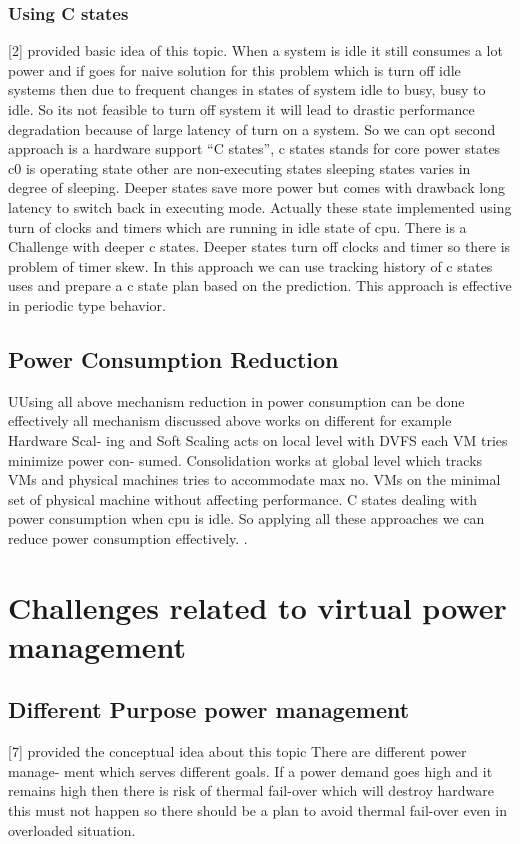 \documentclass[seminar,twoside]{iitbreport}
\begin{document}
\subsubsection{Using C states}
[2] provided basic idea of this topic. When a system is idle it still consumes a lot power
and if goes for naive solution for this problem which is turn off idle systems then due to
frequent changes in states of system idle to busy, busy to idle. So its not feasible to turn off
system it will lead to drastic performance degradation because of large latency of turn on
a system. So we can opt second approach is a hardware support “C states”, c states stands
for core power states c0 is operating state other are non-executing states sleeping states
varies in degree of sleeping. Deeper states save more power but comes with drawback
long latency to switch back in executing mode. Actually these state implemented using
turn of clocks and timers which are running in idle state of cpu. There is a Challenge with
deeper c states. Deeper states turn off clocks and timer so there is problem of timer skew.
In this approach we can use tracking history of c states uses and prepare a c state plan
based on the prediction. This approach is effective in periodic type behavior.
\subsection{Power Consumption Reduction}
UUsing all above mechanism reduction in power consumption can be done effectively
all mechanism discussed above works on different for example Hardware Scal-
ing and Soft Scaling acts on local level with DVFS each VM tries minimize power con-
sumed. Consolidation works at global level which tracks VMs and physical machines
tries to accommodate max no. VMs on the minimal set of physical machine without
affecting performance. C states dealing with power consumption when cpu is idle. So
applying all these approaches we can reduce power consumption effectively.
.

\section{Challenges related to virtual power management}
\subsection{ Different Purpose power management}
[7] provided the conceptual idea about this topic There are different power manage-
ment which serves different goals. If a power demand goes high and it remains high then
there is risk of thermal fail-over which will destroy hardware this must not happen so
there should be a plan to avoid thermal fail-over even in overloaded situation.
\end{document}
